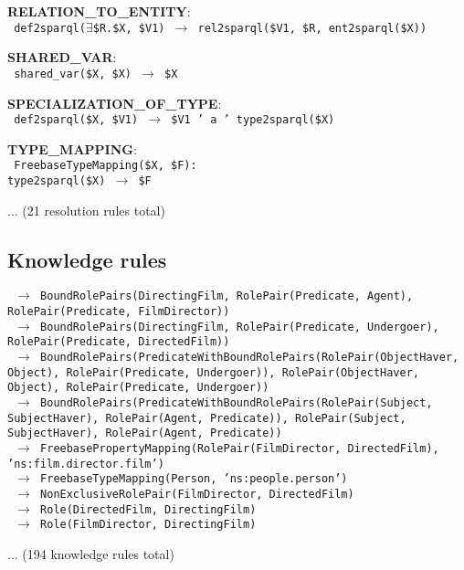 \documentclass[letterpaper]{article}
\begin{document}
{\begin{flushleft}
\begin{flushleft}
\noindent \textbf{RELATION\_TO\_ENTITY}: \\
\texttt{
def2sparql($\exists$\$R.\$X, \$V1) $\rightarrow$ rel2sparql(\$V1, \$R, ent2sparql(\$X))
}
\end{flushleft}
\begin{flushleft}
\noindent \textbf{SHARED\_VAR}: \\
\texttt{
shared\_var(\$X, \$X) $\rightarrow$ \$X
}
\end{flushleft}
\begin{flushleft}
\noindent \textbf{SPECIALIZATION\_OF\_TYPE}: \\
\texttt{
def2sparql(\$X, \$V1) $\rightarrow$ \$V1 ' a ' type2sparql(\$X)
}
\end{flushleft}
\begin{flushleft}
\noindent \textbf{TYPE\_MAPPING}: \\
\texttt{
FreebaseTypeMapping(\$X, \$F):  \\
type2sparql(\$X) $\rightarrow$ \$F
}
\end{flushleft}
\end{flushleft}
}

... (21 resolution rules total)

\subsection{Knowledge rules}

\small{
\begin{flushleft}
\texttt{
$\rightarrow$ BoundRolePairs(DirectingFilm, RolePair(Predicate, Agent), RolePair(Predicate, FilmDirector))
}\\
\texttt{
$\rightarrow$ BoundRolePairs(DirectingFilm, RolePair(Predicate, Undergoer), RolePair(Predicate, DirectedFilm))
}\\
\texttt{
$\rightarrow$ BoundRolePairs(PredicateWithBoundRolePairs(RolePair(ObjectHaver, Object), RolePair(Predicate, Undergoer)), RolePair(ObjectHaver, Object), RolePair(Predicate, Undergoer))
}\\
\texttt{
$\rightarrow$ BoundRolePairs(PredicateWithBoundRolePairs(RolePair(Subject, SubjectHaver), RolePair(Agent, Predicate)), RolePair(Subject, SubjectHaver), RolePair(Agent, Predicate))
}\\
\texttt{
$\rightarrow$ FreebasePropertyMapping(RolePair(FilmDirector, DirectedFilm), 'ns:film.director.film')
}\\
\texttt{
$\rightarrow$ FreebaseTypeMapping(Person, 'ns:people.person')
}\\
\texttt{
$\rightarrow$ NonExclusiveRolePair(FilmDirector, DirectedFilm)
}\\
\texttt{
$\rightarrow$ Role(DirectedFilm, DirectingFilm)
}\\
\texttt{
$\rightarrow$ Role(FilmDirector, DirectingFilm)
}\\
\end{flushleft}

... (194 knowledge rules total)
}
\end{document}
